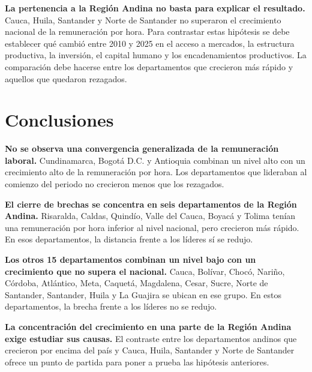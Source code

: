 \textbf{La pertenencia a la Región Andina no basta para explicar el resultado.} Cauca, Huila, Santander y Norte de Santander no superaron el crecimiento nacional de la remuneración por hora. Para contrastar estas hipótesis se debe establecer qué cambió entre 2010 y 2025 en el acceso a mercados, la estructura productiva, la inversión, el capital humano y los encadenamientos productivos. La comparación debe hacerse entre los departamentos que crecieron más rápido y aquellos que quedaron rezagados.

\section{Conclusiones}

\textbf{No se observa una convergencia generalizada de la remuneración laboral.} Cundinamarca, Bogotá D.C. y Antioquia combinan un nivel alto con un crecimiento alto de la remuneración por hora. Los departamentos que lideraban al comienzo del periodo no crecieron menos que los rezagados.

\textbf{El cierre de brechas se concentra en seis departamentos de la Región Andina.} Risaralda, Caldas, Quindío, Valle del Cauca, Boyacá y Tolima tenían una remuneración por hora inferior al nivel nacional, pero crecieron más rápido. En esos departamentos, la distancia frente a los líderes sí se redujo.

\textbf{Los otros 15 departamentos combinan un nivel bajo con un crecimiento que no supera el nacional.} Cauca, Bolívar, Chocó, Nariño, Córdoba, Atlántico, Meta, Caquetá, Magdalena, Cesar, Sucre, Norte de Santander, Santander, Huila y La Guajira se ubican en ese grupo. En estos departamentos, la brecha frente a los líderes no se redujo.

\textbf{La concentración del crecimiento en una parte de la Región Andina exige estudiar sus causas.} El contraste entre los departamentos andinos que crecieron por encima del país y Cauca, Huila, Santander y Norte de Santander ofrece un punto de partida para poner a prueba las hipótesis anteriores.


